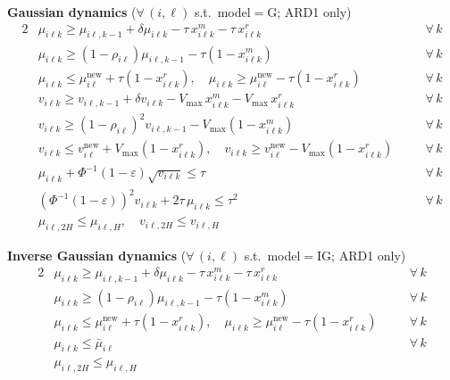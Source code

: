 \documentclass[11pt,a4paper]{article}
\begin{document}
\begin{small}
\vspace{0.3em}
\noindent\textbf{Gaussian dynamics} ($\forall\,(i,\ell)$ s.t.\ model$=$G; ARD1 only)
\begin{alignat}{2}
  &\mu_{i\ell k} \geq \mu_{i\ell,k-1} + \delta\mu_{i\ell k} - \tau\,x^m_{i\ell k}
    - \tau\,x^r_{i\ell k}
  &&\quad\forall\,k \tag{G: mean accumulation} \\
  &\mu_{i\ell k} \geq (1-\rho_{i\ell})\mu_{i\ell,k-1} - \tau(1-x^m_{i\ell k})
  &&\quad\forall\,k \tag{G: ARD1 mean repair} \\
  &\mu_{i\ell k} \leq \mu^{\mathrm{new}}_{i\ell} + \tau(1-x^r_{i\ell k}),\quad
   \mu_{i\ell k} \geq \mu^{\mathrm{new}}_{i\ell} - \tau(1-x^r_{i\ell k})
  &&\quad\forall\,k \tag{G: mean replacement} \\
  &v_{i\ell k} \geq v_{i\ell,k-1} + \delta v_{i\ell k} - V_{\max}\,x^m_{i\ell k}
    - V_{\max}\,x^r_{i\ell k}
  &&\quad\forall\,k \tag{G: var.\ accumulation} \\
  &v_{i\ell k} \geq (1-\rho_{i\ell})^2 v_{i\ell,k-1} - V_{\max}(1-x^m_{i\ell k})
  &&\quad\forall\,k \tag{G: ARD1 var.\ repair} \\
  &v_{i\ell k} \leq v^{\mathrm{new}}_{i\ell} + V_{\max}(1-x^r_{i\ell k}),\quad
   v_{i\ell k} \geq v^{\mathrm{new}}_{i\ell} - V_{\max}(1-x^r_{i\ell k})
  &&\quad\forall\,k \tag{G: var.\ replacement} \\
  &\mu_{i\ell k} + \Phi^{-1}(1-\varepsilon)\sqrt{v_{i\ell k}} \leq \tau
  &&\quad\forall\,k \tag{G: reliability (rotated SOC)} \\
  &(\Phi^{-1}(1-\varepsilon))^2 v_{i\ell k} + 2\tau\,\mu_{i\ell k} \leq \tau^2
  &&\quad\forall\,k \tag{G: reliability (LP approx., inner)} \\
  &\mu_{i\ell,2H} \leq \mu_{i\ell,H},\quad v_{i\ell,2H} \leq v_{i\ell,H}
  &&\tag{G: loop constraint}
\end{alignat}

\vspace{0.3em}
\noindent\textbf{Inverse Gaussian dynamics} ($\forall\,(i,\ell)$ s.t.\ model$=$IG; ARD1 only)
\begin{alignat}{2}
  &\mu_{i\ell k} \geq \mu_{i\ell,k-1} + \delta\mu_{i\ell k} - \tau\,x^m_{i\ell k}
    - \tau\,x^r_{i\ell k}
  &&\quad\forall\,k \tag{IG: mean accumulation} \\
  &\mu_{i\ell k} \geq (1-\rho_{i\ell})\mu_{i\ell,k-1} - \tau(1-x^m_{i\ell k})
  &&\quad\forall\,k \tag{IG: ARD1 mean repair} \\
  &\mu_{i\ell k} \leq \mu^{\mathrm{new}}_{i\ell} + \tau(1-x^r_{i\ell k}),\quad
   \mu_{i\ell k} \geq \mu^{\mathrm{new}}_{i\ell} - \tau(1-x^r_{i\ell k})
  &&\quad\forall\,k \tag{IG: replacement} \\
  &\mu_{i\ell k} \leq \bar{\mu}_{i\ell}
  &&\quad\forall\,k \tag{IG: reliability (precomputed)} \\
  &\mu_{i\ell,2H} \leq \mu_{i\ell,H}
  &&\tag{IG: loop constraint}
\end{alignat}


\end{small}
\end{document}
